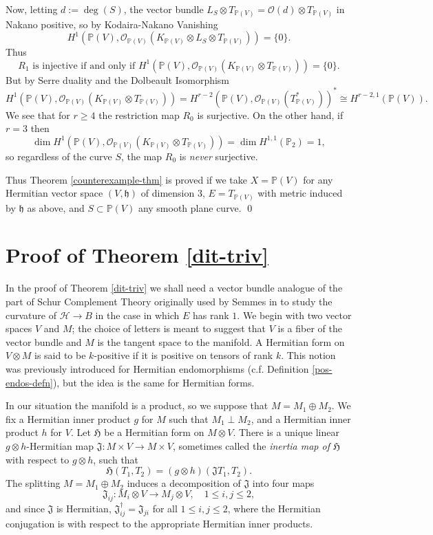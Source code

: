 \documentclass[12pt,hidelinks]{amsart}
\newcommand{\cO}{{\mathcal O}}
\newcommand{\sH}{{\mathscr H}}
\newcommand{\fH}{{\mathfrak H}}
\newcommand{\fJ}{{\mathfrak J}}
\newcommand{\fh}{{\mathfrak h}}
\newcommand{\bbP}{{\mathbb P}}
\newcommand{\tensor}{\otimes}
\begin{document}
Now, letting $d := \deg (S)$, the vector bundle $L_S \tensor T_{\bbP (V)} = \cO (d) \tensor T_{\bbP(V)}$ in Nakano positive, so by Kodaira-Nakano Vanishing 
\[
H^1(\bbP(V), \cO _{\bbP(V)} (K_{\bbP(V)} \tensor L_S \tensor T_{\bbP(V)})) = \{0\}.
\]
Thus 
\[
\text{$R_1$ is injective if and only if }H^1(\bbP(V), \cO _{\bbP(V)} (K_{\bbP(V)} \tensor T_{\bbP(V)}))= \{0\}.
\]
But by Serre duality and  the Dolbeault Isomorphism 
\[
H^1(\bbP(V), \cO _{\bbP(V)} (K_{\bbP(V)} \tensor T_{\bbP(V)})) = H^{r-2} (\bbP(V), \cO_{\bbP(V)} (T_{\bbP(V)} ^*))^* \cong H^{r-2, 1}(\bbP(V)).
\]
We see that for $r \ge 4$ the restriction map $R_0$ is surjective.  On the other hand, if $r=3$ then 
\[
\dim H^1(\bbP(V), \cO _{\bbP(V)} (K_{\bbP(V)} \tensor T_{\bbP(V)})) = \dim H^{1,1}(\bbP_2) = 1,
\]
so regardless of the curve $S$, the map $R_0$ is \emph{never} surjective.    

Thus Theorem \ref{counterexample-thm} is proved if we take $X = \bbP(V)$ for any Hermitian vector space $(V, \fh)$ of dimension $3$, $E = T_{\bbP(V)}$ with metric induced by $\fh$ as above, and $S \subset \bbP(V)$ any smooth plane curve.
\qed

\section{Proof of Theorem \ref{dit-triv}}\label{dit-appendix}

In the proof of Theorem \ref{dit-triv} we shall need a vector bundle analogue of the part of Schur Complement Theory originally used by Semmes in \cite{semmes} to study the curvature of $\sH \to B$ in the case in which $E$ has rank $1$.  We begin with two vector spaces $V$ and $M$; the choice of letters is meant to suggest that $V$ is a fiber of the vector bundle and $M$ is the tangent space to the manifold.  A Hermitian form on $V \tensor M$ is said to be $k$-positive if it is positive on tensors of rank $k$.  This notion was previously introduced for Hermitian endomorphisms (c.f. Definition \ref{pos-endos-defn}), but the idea is the same for Hermitian forms.

In our situation the manifold is a product, so we suppose that $M = M_1 \oplus M_2$.  We fix a Hermitian inner product $g$ for $M$ such that $M_1 \perp M_2$, and a Hermitian inner product $h$ for $V$.  Let $\fH$ be a Hermitian form on $M \tensor V$.  There is a unique linear $g \tensor h$-Hermitian map $\fJ : M \times V \to M \times V$, sometimes called the \emph{inertia map of $\fH$} with respect to $g \tensor h$, such that 
\[
\fH (T_1, T_2) = (g \tensor h)(\fJ T_1, T_2).
\]
The splitting $M = M_1 \oplus M_2$ induces a decomposition of $\fJ$ into four maps 
\[
\fJ _{ij} :M_i \tensor V \to M_j \tensor V, \quad 1 \le i,j\le 2,
\]
and since $\fJ$ is Hermitian, $ \fJ^{\dagger}_{ij} = \fJ _{ji}$ for all $1 \le i,j\le 2$,
where the Hermitian conjugation is with respect to the appropriate Hermitian inner products.
\end{document}
